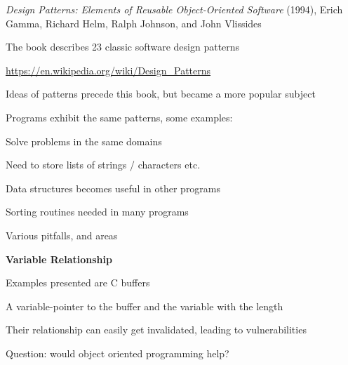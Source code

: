 \documentclass[Screen16to9,17pt]{foils}
\begin{document}





\begin{list2}
\item \emph{Design Patterns: Elements of Reusable Object-Oriented Software} (1994), Erich Gamma, Richard Helm, Ralph Johnson, and John Vlissides

\item The book describes 23 classic software design patterns

\item \url{https://en.wikipedia.org/wiki/Design_Patterns}

\item Ideas of patterns precede this book, but became a more popular subject
\end{list2}





\begin{list2}
\item Programs exhibit the same patterns, some examples:
\item Solve problems in the same domains
\item Need to store lists of strings / characters etc.
\item Data structures becomes useful in other programs
\item Sorting routines needed in many programs
\end{list2}






Various pitfalls, and areas
\begin{list2}
\item {\bf Variable Relationship}
\item Examples presented are C buffers
\item A variable-pointer to the buffer and the variable with the length
\item Their relationship can easily get invalidated, leading to vulnerabilities
\item Question: would object oriented programming help?
\end{list2}



\end{document}
